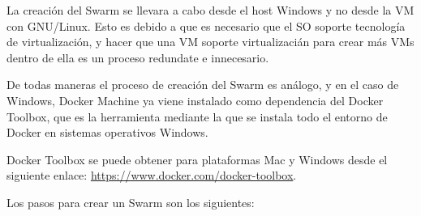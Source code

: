 			La creación del Swarm se llevara a cabo desde el host Windows y no desde la VM con GNU/Linux. Esto es debido a que es necesario que el SO soporte tecnología de virtualización, y hacer que una VM soporte virtualizacián para crear más VMs dentro de ella es un proceso redundate e innecesario.
			
			De todas maneras el proceso de creación del Swarm es análogo, y en el caso de Windows, Docker Machine ya viene instalado como dependencia del Docker Toolbox, que es la herramienta mediante la que se instala todo el entorno de Docker en sistemas operativos Windows.
			
			Docker Toolbox se puede obtener para plataformas Mac y Windows desde el siguiente enlace: \url{https://www.docker.com/docker-toolbox}.
			
			Los pasos para crear un Swarm son los siguientes: \cite{docker-swarm-and-machine}
